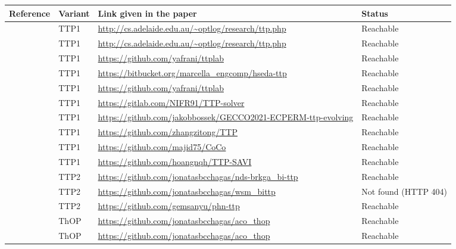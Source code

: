 
\begin{center}
\footnotesize
{}
\label{tab:codelinks}
\setlength{\tabcolsep}{4pt}
\renewcommand{\arraystretch}{1.15}
\begin{tabular}{@{}p{3.6cm}lp{7.6cm}p{2.4cm}@{}}
\toprule
\textbf{Reference} & \textbf{Variant} & \textbf{Link given in the paper} & \textbf{Status} \\
\midrule
\citet{polyakovskiy2014comprehensive} & TTP1 & \url{http://cs.adelaide.edu.au/~optlog/research/ttp.php} & Reachable \\
\citet{wagner2016stealing} & TTP1 & \url{http://cs.adelaide.edu.au/~optlog/research/ttp.php} & Reachable \\
\citet{el2017local} & TTP1 & \url{https://github.com/yafrani/ttplab} & Reachable \\
\citet{martins2017hseda} & TTP1 & \url{https://bitbucket.org/marcella_engcomp/hseda-ttp} & Reachable \\
\citet{el2018efficiently} & TTP1 & \url{https://github.com/yafrani/ttplab} & Reachable \\
\citet{nieto2018guided} & TTP1 & \url{https://gitlab.com/NIFR91/TTP-solver} & Reachable \\
\citet{bossek2021generating} & TTP1 & \url{https://github.com/jakobbossek/GECCO2021-ECPERM-ttp-evolving} & Reachable \\
\citet{zhang2021solving} & TTP1 & \url{https://github.com/zhangzitong/TTP} & Reachable \\
\citet{namazi2023solving} & TTP1 & \url{https://github.com/majid75/CoCo} & Reachable \\
\citet{nguyen2023simulated} & TTP1 & \url{https://github.com/hoangnqh/TTP-SAVI} & Reachable \\
\midrule
\citet{chagas2021non} & TTP2 & \url{https://github.com/jonatasbcchagas/nds-brkga_bi-ttp} & Reachable \\
\citet{chagas2022weighted} & TTP2 & \url{https://github.com/jonatasbcchagas/wsm_bittp} & Not found (HTTP 404) \\
\citet{santiyuda2024solving} & TTP2 & \url{https://github.com/gemsanyu/phn-ttp} & Reachable \\
\midrule
\citet{chagas2020ants} & ThOP & \url{https://github.com/jonatasbcchagas/aco_thop} & Reachable \\
\citet{chagas2022efficiently} & ThOP & \url{https://github.com/jonatasbcchagas/aco_thop} & Reachable \\
\bottomrule
\end{tabular}
\end{center}
